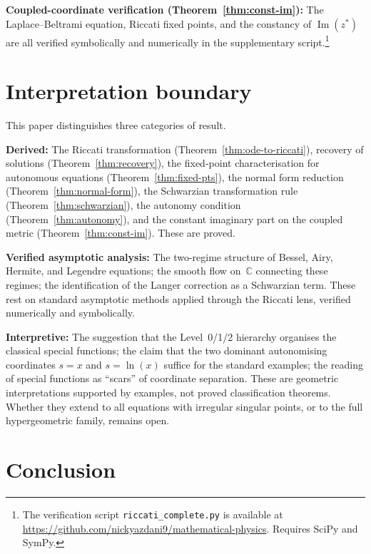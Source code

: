 \documentclass{amsart}
\theoremstyle{definition}
\theoremstyle{remark}
\begin{document}
\textbf{Coupled-coordinate verification (Theorem~\ref{thm:const-im}):} The Laplace--Beltrami equation, Riccati fixed points, and the constancy of $\operatorname{Im}(z^*)$ are all verified symbolically and numerically in the supplementary script.\footnote{The verification script \texttt{riccati\_complete.py} is available at \url{https://github.com/nickyazdani9/mathematical-physics}. Requires SciPy and SymPy.}

\section{Interpretation boundary}

This paper distinguishes three categories of result.

\textbf{Derived:} The Riccati transformation (Theorem~\ref{thm:ode-to-riccati}), recovery of solutions (Theorem~\ref{thm:recovery}), the fixed-point characterisation for autonomous equations (Theorem~\ref{thm:fixed-pts}), the normal form reduction (Theorem~\ref{thm:normal-form}), the Schwarzian transformation rule (Theorem~\ref{thm:schwarzian}), the autonomy condition (Theorem~\ref{thm:autonomy}), and the constant imaginary part on the coupled metric (Theorem~\ref{thm:const-im}). These are proved.

\textbf{Verified asymptotic analysis:} The two-regime structure of Bessel, Airy, Hermite, and Legendre equations; the smooth flow on~$\mathbb{C}$ connecting these regimes; the identification of the Langer correction as a Schwarzian term. These rest on standard asymptotic methods applied through the Riccati lens, verified numerically and symbolically.

\textbf{Interpretive:} The suggestion that the Level~0/1/2 hierarchy organises the classical special functions; the claim that the two dominant autonomising coordinates $s = x$ and $s = \ln(x)$ suffice for the standard examples; the reading of special functions as ``scars'' of coordinate separation. These are geometric interpretations supported by examples, not proved classification theorems. Whether they extend to all equations with irregular singular points, or to the full hypergeometric family, remains open.

\newpage
\section{Conclusion}
\end{document}
